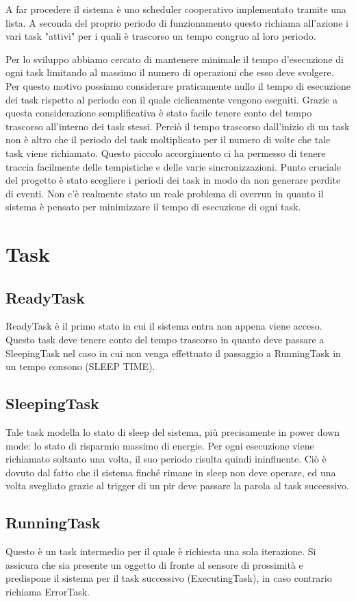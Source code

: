 \documentclass[a4paper,12pt]{report}
\begin{document}
A far procedere il sistema è uno scheduler cooperativo implementato tramite una lista. A seconda del proprio periodo di funzionamento questo richiama all'azione i vari task "attivi" per i quali è trascorso un tempo congruo al loro periodo.

Per lo sviluppo abbiamo cercato di mantenere minimale il tempo d'esecuzione di ogni task limitando al massimo il numero di operazioni che esso deve svolgere. Per questo motivo possiamo considerare praticamente nullo il tempo di esecuzione dei task rispetto al periodo con il quale ciclicamente vengono eseguiti. Grazie a questa considerazione semplificativa è stato facile tenere conto del tempo trascorso all'interno dei task stessi. Perciò il tempo trascorso dall'inizio di un task non è altro che il periodo del task moltiplicato per il numero di volte che tale task viene richiamato. Questo piccolo accorgimento ci ha permesso di tenere traccia facilmente delle tempistiche e delle varie sincronizzazioni.
Punto cruciale del progetto è stato scegliere i periodi dei task in modo da non generare perdite di eventi.
Non c'è realmente stato un reale problema di overrun in quanto il sistema è pensato per minimizzare il tempo di esecuzione di ogni task.

\chapter{Task}
\section{ReadyTask}
ReadyTask è il primo stato in cui il sistema entra non appena viene acceso. 
Questo task deve tenere conto del tempo trascorso in quanto deve passare a SleepingTask nel caso in cui non venga effettuato il passaggio a RunningTask in un tempo consono (SLEEP TIME).

\section{SleepingTask}
Tale task modella lo stato di sleep del sistema, più precisamente in power down mode: lo stato di risparmio massimo di energie. 
Per ogni esecuzione viene richiamato soltanto una volta, il suo periodo risulta quindi ininfluente. Ciò è dovuto dal fatto che il sistema finché rimane in sleep non deve operare, ed una volta svegliato grazie al trigger di un pir deve passare la parola al task successivo.

\section{RunningTask}
Questo è un task intermedio per il quale è richiesta una sola iterazione. Si assicura che sia presente un oggetto di fronte al sensore di prossimità e predispone il sistema per il task successivo (ExecutingTask), in caso contrario richiama ErrorTask.
\end{document}
